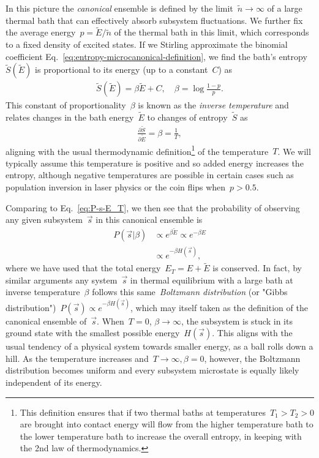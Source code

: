 In this picture the \emph{canonical} ensemble is defined by the limit~$\tilde{n} \rightarrow \infty$ of a large thermal bath that can effectively absorb subsystem fluctuations. We further fix the average energy~$p = \tilde{E}/\tilde{n}$ of the thermal bath in this limit, which corresponds to a fixed density of excited states. If we Stirling approximate the binomial coefficient Eq.~\eqref{eq:entropy-microcanonical-definition}, we find the bath's entropy~$\tilde{S}(\tilde{E})$ is proportional to its energy (up to a constant~$C$) as \begin{align}
    \tilde{S}(\tilde{E}) = \beta \tilde{E} + C, \quad \beta = \log \frac{1-p}{p}. \label{eq:tilde-S-tilde-E}
\end{align}
This constant of proportionality~$\beta$ is known as the \emph{inverse temperature} and relates changes in the bath energy~$\tilde{E}$ to changes of entropy~$\tilde{S}$ as \begin{align}
    \frac{\partial \tilde{S}}{\partial \tilde{E}} = \beta = \frac{1}{T}, \label{eq:temperature-definition}
\end{align}
aligning with the usual thermodynamic definition\footnote{This definition ensures that if two thermal baths at temperatures~$T_1 > T_2 > 0$ are brought into contact energy will flow from the higher temperature bath to the lower temperature bath to increase the overall entropy, in keeping with the 2nd law of thermodynamics.} of the temperature~$T$. We will typically assume this temperature is positive and so added energy increases the entropy, although negative temperatures are possible in certain cases such as population inversion in laser physics or the coin flips when~$p > 0.5$.

Comparing to Eq.~\eqref{eq:P-s-E_T}, we then see that the probability of observing any given subsystem~$\vec{s}$ in this canonical ensemble is \begin{align}
    P(\vec{s}|\beta) &\propto e^{\beta \tilde{E}}  \propto e^{-\beta E} \nonumber \\
    &\propto e^{-\beta H(\vec{s})},
\end{align}
where we have used that the total energy~$E_T = E + \tilde{E}$ is conserved. In fact, by similar arguments any system~$\vec{s}$ in thermal equilibrium with a large bath at inverse temperature~$\beta$ follows this same~\emph{Boltzmann distribution} (or "Gibbs distribution")~$P(\vec{s}) \propto e^{-\beta H(\vec{s})}$, which may itself taken as the definition of the canonical ensemble of~$\vec{s}$. When~$T = 0$, $\beta \rightarrow \infty$, the subsystem is stuck in its ground state with the smallest possible energy~$H(\vec{s})$. This aligns with the usual tendency of a physical system towards smaller energy, as a ball rolls down a hill. As the temperature increases and~$T \rightarrow \infty, \beta = 0$, however, the Boltzmann distribution becomes uniform and every subsystem microstate is equally likely independent of its energy.

